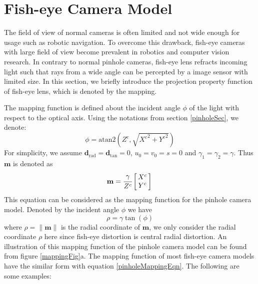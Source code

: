 \documentclass{report}
\begin{document}
\section{Fish-eye Camera Model}
The field of view of normal cameras is often limited and not wide enough for usage such as robotic navigation. To overcome this drawback, fish-eye cameras with large field of view become prevalent in robotics and computer vision research. In contrary to normal pinhole cameras, fish-eye lens refracts incoming light such that rays from a wide angle can be percepted by a image sensor with limited size. In this section, we briefly introduce the projection property function of fish-eye lens, which is denoted by the mapping. 

The mapping function is defined about the incident angle $\phi$ of the light with respect to the optical axis. Using the notations from section \ref{pinholeSec}, we denote: 
\begin{equation}
\phi = \text{atan2} (Z^c, \sqrt{{X^c}^2 + {Y^c}^2})
\end{equation}
For simplicity, we assume $\mathbf{d}_\text{rad} = \mathbf{d}_\text{tan} = 0$, $u_0 = v_0 = s = 0$ and $\gamma_1 = \gamma_2 = \gamma$. Thus $\mathbf{m}$ is denoted as
\begin{equation}
\mathbf{m} = \cfrac{\gamma}{Z^c}
\arraycolsep=1.5pt%
\begin{bmatrix}
\begin{array}{c}
X^c \\ Y^c
\end{array}
\label{rayEqn}
\end{bmatrix} \\
\end{equation}
This equation can be considered as the mapping function for the pinhole camera model. Denoted by the incident angle $\phi$ we have 
\begin{equation}
\rho = \gamma \tan(\phi)
\label{pinholeMappingEqn}
\end{equation}
where $\rho = \|\mathbf{m}\|$ is the radial coordinate of $\mathbf{m}$, we only consider the radial coordinate $\rho$ here since fish-eye distortion is central radial distortion. An illustration of this mapping function of the pinhole camera model can be found from figure \ref{mappingFig}a. The mapping function of most fish-eye camera models have the similar form with equation \ref{pinholeMappingEqn}. The following are some examples: 
\end{document}
